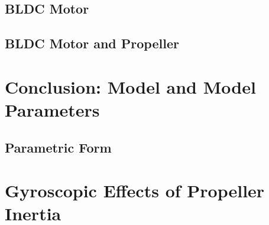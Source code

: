 \documentclass[letterpaper, 11pt]{article}
\begin{document}
\subsection{BLDC Motor}
\subsection{BLDC Motor and Propeller}
\section{Conclusion: Model and Model Parameters}
\subsection{Parametric Form}
\section{Gyroscopic Effects of Propeller Inertia}


\end{document}
